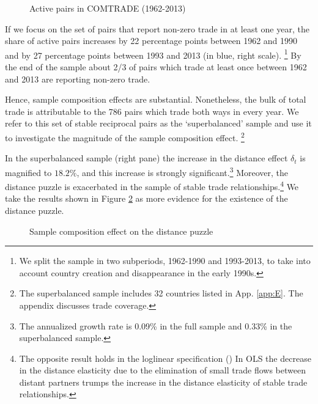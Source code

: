 \documentclass[12pt,twoside,a4paper,notitlepage]{article}
\begin{document}
\begin{figure}[h!]
\caption{Active pairs in COMTRADE (1962-2013) \label{fig:active_pairs}}
\begin{center}
\setlength{\fboxrule}{1pt} %
\setlength{\fboxsep}{.1in} %
\end{center}
\end{figure}

If we focus on the set of pairs that report non-zero trade in at least one year, the share of active pairs increases by 22 percentage points between 1962 and 1990 and by 27 percentage points between 1993 and 2013 (in blue, right scale).
\footnote{We split the sample in two subperiods, 1962-1990 and 1993-2013, to take into account country creation and disappearance in the early 1990s.}
By the end of the sample about 2/3 of pairs which trade at least once between 1962 and 2013 are reporting non-zero trade.


Hence, sample composition effects are substantial.
Nonetheless, the bulk of total trade is attributable to the 786 pairs which trade both ways in every year.
We refer to this set of stable reciprocal pairs as the `superbalanced' sample and use it to investigate the magnitude of the sample composition effect.
\footnote{The superbalanced sample includes 32 countries listed in App. \ref{app:E}. The appendix discusses trade coverage.\label{fnsuperbalanced}}


In the superbalanced sample (right pane) the increase in the distance effect $\delta_t$ is magnified to $18.2$\%, and this increase is strongly significant.\footnote{The annualized growth rate is 0.09\% in the full sample and 0.33\% in the superbalanced sample.}
Moreover, the distance puzzle is exacerbated in the sample of stable trade relationships.\footnote{The opposite result holds in the loglinear specification (\cite{Head2013})
In OLS the decrease in the distance elasticity due to the elimination of small trade flows between distant partners trumps the increase in the distance elasticity of stable trade relationships.}
We take the results shown in Figure \ref{fig:compsample} as more evidence for the existence of the distance puzzle. 

\begin{figure}[h!]
	\caption{Sample composition effect on the distance puzzle\label{fig:compsample}}
	\begin{center}
		\setlength{\fboxrule}{1pt} %
		\setlength{\fboxsep}{.1in} %
	\end{center}
\end{figure}
\end{document}
